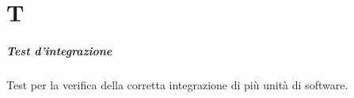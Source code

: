 \chapter{T}

\paragraph*{Test d'integrazione}
Test per la verifica della corretta integrazione di più unità di software.